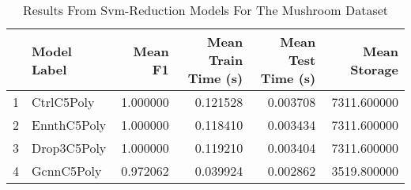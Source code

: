 \begin{table}
\centering
\caption{Results From Svm-Reduction Models For The Mushroom Dataset}
\label{tab:svm_reduction_results_mushroom}
\begin{tabular}{rlrrrr}
\toprule
 & Model Label & Mean F1 & Mean Train Time (s) & Mean Test Time (s) & Mean Storage \\
\midrule
1 & CtrlC5Poly & 1.000000 & 0.121528 & 0.003708 & 7311.600000 \\
2 & EnnthC5Poly & 1.000000 & 0.118410 & 0.003434 & 7311.600000 \\
3 & Drop3C5Poly & 1.000000 & 0.119210 & 0.003404 & 7311.600000 \\
4 & GcnnC5Poly & 0.972062 & 0.039924 & 0.002862 & 3519.800000 \\
\bottomrule
\end{tabular}
\end{table}
